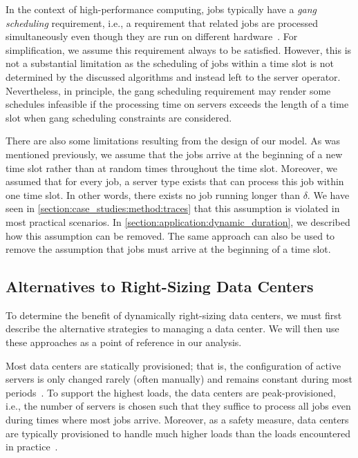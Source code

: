 In the context of high-performance computing, jobs typically have a \emph{gang scheduling} requirement, i.e., a requirement that related jobs are processed simultaneously even though they are run on different hardware~\cite{Amvrosiadis2018}. For simplification, we assume this requirement always to be satisfied. However, this is not a substantial limitation as the scheduling of jobs within a time slot is not determined by the discussed algorithms and instead left to the server operator. Nevertheless, in principle, the gang scheduling requirement may render some schedules infeasible if the processing time on servers exceeds the length of a time slot when gang scheduling constraints are considered.

There are also some limitations resulting from the design of our model. As was mentioned previously, we assume that the jobs arrive at the beginning of a new time slot rather than at random times throughout the time slot. Moreover, we assumed that for every job, a server type exists that can process this job within one time slot. In other words, there exists no job running longer than $\delta$. We have seen in \cref{section:case_studies:method:traces} that this assumption is violated in most practical scenarios. In \cref{section:application:dynamic_duration}, we described how this assumption can be removed. The same approach can also be used to remove the assumption that jobs must arrive at the beginning of a time slot.

\subsection{Alternatives to Right-Sizing Data Centers}\label{section:case_studies:method:alternatives}

To determine the benefit of dynamically right-sizing data centers, we must first describe the alternative strategies to managing a data center. We will then use these approaches as a point of reference in our analysis.

Most data centers are statically provisioned; that is, the configuration of active servers is only changed rarely (often manually) and remains constant during most periods~\cite{Whitney2014}. To support the highest loads, the data centers are peak-provisioned, i.e., the number of servers is chosen such that they suffice to process all jobs even during times where most jobs arrive. Moreover, as a safety measure, data centers are typically provisioned to handle much higher loads than the loads encountered in practice~\cite{Whitney2014}.

